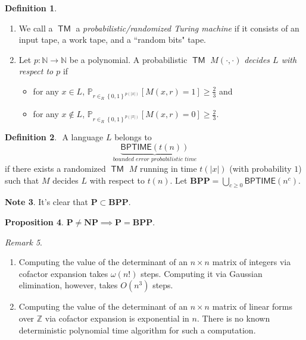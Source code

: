 \documentclass[10pt,letterpaper,cm]{nupset}
\theoremstyle{definition}
\newtheorem{definition}{Definition}[subsection]
\newtheorem{note}[definition]{Note}
\theoremstyle{theorem}
\newtheorem{prop}[definition]{Proposition}
\theoremstyle{remark}
\newtheorem{remark}[definition]{Remark}
\newcommand{\N}{\mathbb N}
\newcommand{\Z}{\mathbb Z}
\newcommand{\1}{\mathbf{1}}
\newcommand{\0}{\vec 0}
\DeclareMathOperator{\TM}{\mathsf{TM}}
\begin{document}
\begin{definition} $ $
\begin{enumerate}
\item We call a $\TM$ a \textit{probabilistic/randomized Turing machine} if it consists of an input tape, a work tape, and a ``random bits" tape.  
\item Let $p: \N \to \N$ be a polynomial. A probabilistic $\TM$ $M({\cdot}, {\cdot})$ \textit{decides $L$ with respect to $p$} if 
\begin{itemize}
\item for any $x\in L$, $\mathbb{P}_{r\in_R \left\{0,1\right\}^{p(\left\lvert{x}\right\rvert)}}[M(x,r)=1] \geq \frac{2}{3}$ and
\item for any $x\notin L$, $\mathbb{P}_{r\in_R \left\{0,1\right\}^{p(\left\lvert{x}\right\rvert)}}[M(x,r)=0] \geq \frac{2}{3}$.
\end{itemize}
\end{enumerate}
\end{definition}

\begin{definition} $ $
A language $L$ belongs to $$\underbrace{\mathsf{BPTIME}(t(n))}_{\textit{bounded error probabilistic time}}$$ if there exists a randomized $\TM$ $M$ running in time $t(\left\lvert{x}\right\rvert)$ (with probability $1$) such that $M$ decides $L$ with respect to $t(n)$. Let $\mathbf{BPP}= \bigcup_{c\geq 0} \mathsf{BPTIME}(n^c)$.
\end{definition}

\begin{note}
It's clear that $\mathbf{P} \subset \mathbf{BPP}$.
\end{note}

\begin{prop}
$\mathbf{P} \ne \mathbf{NP} \implies \mathbf{P} = \mathbf{BPP}$.
\end{prop}

\bigskip

\begin{remark} $ $
\begin{enumerate}
\item Computing the value of the determinant of an $n\times n$ matrix of integers via cofactor expansion takes $\omega(n!)$ steps. Computing it via Gaussian elimination, however, takes $O(n^3)$ steps. 
\item Computing the value of the determinant of an $n\times n$ matrix of linear forms over $\Z$ via cofactor expansion is exponential in $n$. There is no known deterministic polynomial time algorithm for such a computation.
\end{enumerate}
\end{remark}
\end{document}

